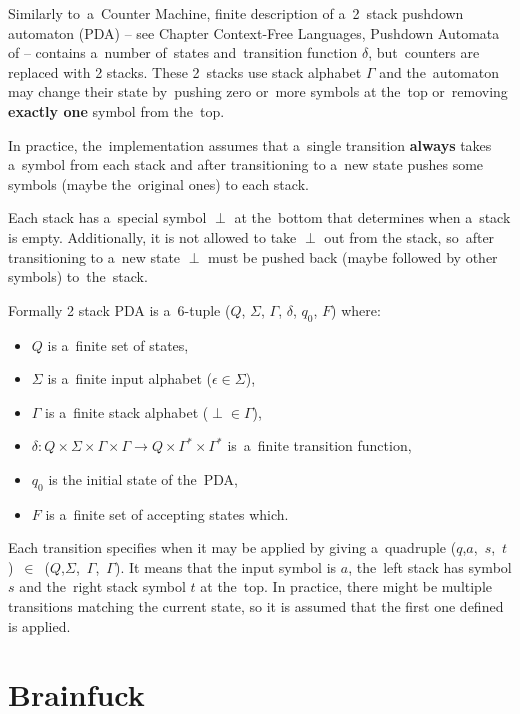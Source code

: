 \documentclass[english,shortabstract,mgr]{iithesis}
\begin{document}
Similarly to~a~Counter Machine, finite description of a~2~stack pushdown automaton
(PDA) -- see Chapter Context-Free Languages, Pushdown Automata of \cite{sipser2012ChurchTuring}
-- contains a~number of~states and~transition function $\delta$, but~counters are replaced with 2 stacks.
These 2~stacks use stack alphabet $\Gamma$ and the~automaton may change their state
by~pushing zero or~more symbols at the~top or~removing \textbf{exactly one} symbol from
the~top.

In practice, the~implementation assumes that a~single transition \textbf{always} takes
a~symbol from each stack and after transitioning to a~new state pushes some symbols
(maybe the~original ones) to each stack.

Each stack has a~special symbol $\perp$ at the~bottom that determines when a~stack is
empty. Additionally, it is not allowed to take $\perp$ out from the stack, so~after transitioning
to a~new state $\perp$ must be pushed back (maybe followed by other symbols) to~the~stack.

Formally 2 stack PDA is a~$6$-tuple ($Q$, $\Sigma$, $\Gamma$, $\delta$, $q_0$, $F$) where:
\begin{itemize}
  \item $Q$ is a~finite set of states,
  \item $\Sigma$ is a~finite input alphabet ($\epsilon \in \Sigma$),
  \item $\Gamma$ is a~finite stack alphabet ($\perp \in \Gamma$),
  \item $\delta: Q \times \Sigma \times \Gamma \times \Gamma \rightarrow
      Q \times \Gamma^* \times \Gamma^*$ is~a~finite transition function,
  \item $q_0$ is the initial state of the~PDA,
  \item $F$ is a~finite set of accepting states which.
\end{itemize}

Each transition specifies when it may be applied by giving a~quadruple
($q$,$a$,~$s$,~$t$)~$\in$~($Q$,$\Sigma$,~$\Gamma$,~$\Gamma$). It means that the input symbol is $a$,
the~left stack has symbol $s$ and the~right stack symbol $t$ at the~top. In practice, there
might be multiple transitions matching the current state, so it is assumed that the first one
defined is applied.

\section{Brainfuck}
\end{document}
